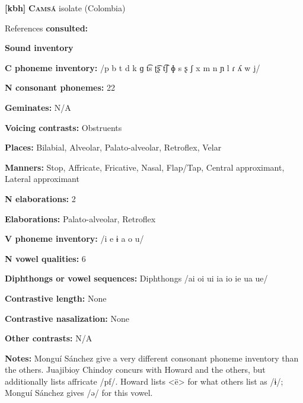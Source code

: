 \textbf{[kbh]}   \textbf{\textsc{Camsá}}  isolate (Colombia)



References \textbf{consulted:} \citet{Fabre2002,Howard1967,Howard1972,JuajibioyChindoy1962,MonguíSánchez1981}



\textbf{Sound inventory}



\textbf{C phoneme inventory:} /p b t d k ɡ t͡s ʈ͡ʂ t͡ʃ ɸ s ʂ ʃ x m n ɲ l ɾ ʎ w j/



\textbf{N consonant phonemes:} 22



\textbf{Geminates:} N/A



\textbf{Voicing contrasts:} Obstruents



\textbf{Places:} Bilabial, Alveolar, Palato-alveolar, Retroflex, Velar



\textbf{Manners:} Stop, Affricate, Fricative, Nasal, Flap/Tap, Central approximant, Lateral approximant



\textbf{N elaborations:} 2



\textbf{Elaborations:} Palato-alveolar, Retroflex



\textbf{V phoneme inventory:} /i e ɨ a o u/



\textbf{N vowel qualities:} 6



\textbf{Diphthongs or vowel sequences:} Diphthongs /ai oi ui ia io ie ua ue/



\textbf{Contrastive length:} None



\textbf{Contrastive nasalization:} None



\textbf{Other contrasts:} N/A



\textbf{Notes:} Monguí Sánchez give a very different consonant phoneme inventory than the others. Juajibioy Chindoy concurs with Howard and the others, but additionally lists affricate /pf/. Howard lists <ë> for what others list as /ɨ/; Monguí Sánchez gives /ə/ for this vowel.



